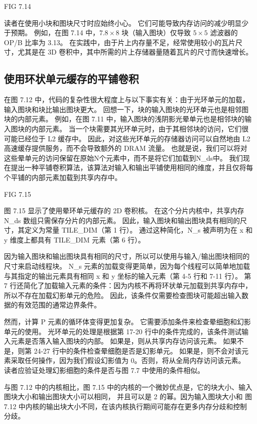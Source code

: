 {\color{red} FIG 7.14}

读者在使用小块和图块尺寸时应始终小心。 它们可能导致内存访问的减少明显少于预期。 
例如，在图 7.14 中，$7.8 \times 8$ 块（输入图块）仅导致 $5 \times 5$ 滤波器的 OP/B 比率为 3.13。 
在实践中，由于片上内存量不足，经常使用较小的瓦片尺寸，尤其是在 3D 卷积中，其中所需的片上存储器量随着瓦片的尺寸而快速增长。

\subsection{使用环状单元缓存的平铺卷积}
在图 7.12 中，代码的复杂性很大程度上与以下事实有关：由于光环单元的加载，输入图块和块比输出图块更大。 
回想一下，块的输入图块的光环单元也是相邻图块的内部元素。 
例如，在图 7.11 中，输入图块的浅阴影光晕单元也是相邻块的输入图块的内部元素。 
当一个块需要其光环单元时，由于其相邻块的访问，它们很可能已经位于 L2 缓存中。 
因此，对这些光环单元的存储器访问可以自然地由 L2 高速缓存提供服务，而不会导致额外的 DRAM 流量。 
也就是说，我们可以将对这些晕单元的访问保留在原始N个元素中，而不是将它们加载到N\_ds中。 
我们现在提出一种平铺卷积算法，该算法对输入和输出平铺使用相同的维度，并且仅将每个平铺的内部元素加载到共享内存中。

{\color{red} FIG 7.15}

图 7.15 显示了使用晕环单元缓存的 2D 卷积核。 在这个分片内核中，共享内存 N\_ds 数组只需保存分片的内部元素。 
因此，输入图块和输出图块具有相同的尺寸，其定义为常量 TILE\_DIM（第 1 行）。 
通过这种简化，N\_s 被声明为在 x 和 y 维度上都具有 TILE\_DIM 元素（第 6 行）。

因为输入图块和输出图块具有相同的尺寸，所以可以使用与输入/输出图块相同的尺寸来启动线程块。 
N\_s 元素的加载变得更简单，因为每个线程可以简单地加载与其指定的输出元素具有相同 x 和 y 坐标的输入元素（第 4-5 行和 7-11 行）。 
第 7 行还简化了加载输入元素的条件：因为内核不再将环状单元加载到共享内存中，所以不存在加载幻影单元的危险。 
因此，该条件仅需要检查图块可能超出输入数据的有效范围的通常边界条件。

然而，计算 P 元素的循环体变得更加复杂。 它需要添加条件来检查晕细胞和幻影单元的使用。 
光环单元的处理是根据第 17-20 行中的条件完成的，该条件测试输入元素是否落入输入图块的内部。 
如果是，则从共享内存访问该元素。 如果不是，则第 24-27 行中的条件检查晕细胞是否是幻影单元。 
如果是，则不会对该元素采取任何操作，因为我们假设幻影值为 0。否则，将从全局内存访问该元素。 
读者应验证处理幻影细胞的条件是否与图 7.7 中使用的条件相似。

与图 7.12 中的内核相比，图 7.15 中的内核的一个微妙优点是，它的块大小、输入图块大小和输出图块大小可以相同，
并且可以是 2 的幂。因为输入图块大小和 图 7.12 中内核的输出块大小不同，在该内核执行期间可能存在更多内存分歧和控制分歧。

